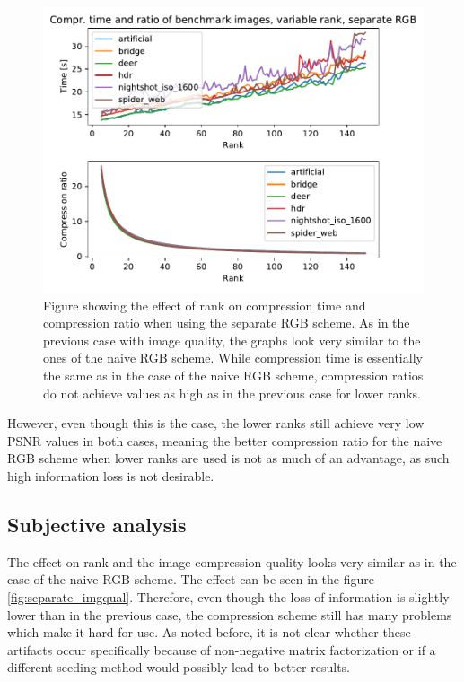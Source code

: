 \documentclass[thesis=M,english]{FITthesis}[2012/10/20]
\begin{document}
\begin{figure}[h]
  \centering
  \includegraphics[scale=0.7]{imgs/results/comprtimeratio_separate}
  \caption[Compression time and ratio of separate RGB scheme, variable rank]{Figure showing
           the effect of rank on compression time and compression ratio when using
           the separate RGB scheme. As in the previous case with image quality, the graphs
           look very similar to the ones of the naive RGB scheme. While compression time
           is essentially the same as in the case of the naive RGB scheme, compression ratios
           do not achieve values as high as in the previous case for lower ranks.}
  \label{fig:comprtime_separate}
\end{figure}

However, even though this is the case, the lower ranks still achieve very low PSNR
values in both cases, meaning the better compression ratio for the naive RGB scheme
when lower ranks are used is not as much of an advantage, as such high information
loss is not desirable.

\subsection{Subjective analysis}
The effect on rank and the image compression quality looks very similar as in the case
of the naive RGB scheme. The effect can be seen in the figure \ref{fig:separate_imgqual}.
Therefore, even though the loss of information is slightly lower than in the previous case,
the compression scheme still has many problems which make it hard for use. As noted before,
it is not clear whether these artifacts occur specifically because of non-negative
matrix factorization or if a different seeding method would possibly lead to better results.
\end{document}
